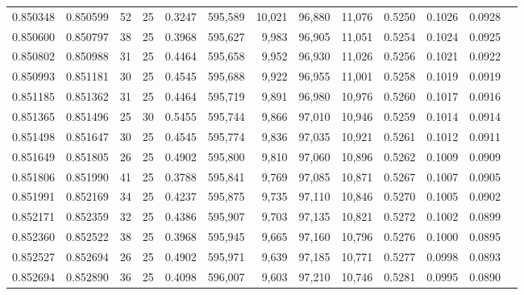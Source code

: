 \begin{tabular}{rrrrrrrrrrrrr}
0.850348 & 0.850599 &    52 &  25 &                                     0.3247 & 595,589 &  10,021 &  96,880 &  11,076 & 0.5250 & 0.1026 & 0.0928 \\
0.850600 & 0.850797 &    38 &  25 &                                     0.3968 & 595,627 &   9,983 &  96,905 &  11,051 & 0.5254 & 0.1024 & 0.0925 \\
0.850802 & 0.850988 &    31 &  25 &                                     0.4464 & 595,658 &   9,952 &  96,930 &  11,026 & 0.5256 & 0.1021 & 0.0922 \\
0.850993 & 0.851181 &    30 &  25 &                                     0.4545 & 595,688 &   9,922 &  96,955 &  11,001 & 0.5258 & 0.1019 & 0.0919 \\
0.851185 & 0.851362 &    31 &  25 &                                     0.4464 & 595,719 &   9,891 &  96,980 &  10,976 & 0.5260 & 0.1017 & 0.0916 \\
0.851365 & 0.851496 &    25 &  30 &                                     0.5455 & 595,744 &   9,866 &  97,010 &  10,946 & 0.5259 & 0.1014 & 0.0914 \\
0.851498 & 0.851647 &    30 &  25 &                                     0.4545 & 595,774 &   9,836 &  97,035 &  10,921 & 0.5261 & 0.1012 & 0.0911 \\
0.851649 & 0.851805 &    26 &  25 &                                     0.4902 & 595,800 &   9,810 &  97,060 &  10,896 & 0.5262 & 0.1009 & 0.0909 \\
0.851806 & 0.851990 &    41 &  25 &                                     0.3788 & 595,841 &   9,769 &  97,085 &  10,871 & 0.5267 & 0.1007 & 0.0905 \\
0.851991 & 0.852169 &    34 &  25 &                                     0.4237 & 595,875 &   9,735 &  97,110 &  10,846 & 0.5270 & 0.1005 & 0.0902 \\
0.852171 & 0.852359 &    32 &  25 &                                     0.4386 & 595,907 &   9,703 &  97,135 &  10,821 & 0.5272 & 0.1002 & 0.0899 \\
0.852360 & 0.852522 &    38 &  25 &                                     0.3968 & 595,945 &   9,665 &  97,160 &  10,796 & 0.5276 & 0.1000 & 0.0895 \\
0.852527 & 0.852694 &    26 &  25 &                                     0.4902 & 595,971 &   9,639 &  97,185 &  10,771 & 0.5277 & 0.0998 & 0.0893 \\
0.852694 & 0.852890 &    36 &  25 &                                     0.4098 & 596,007 &   9,603 &  97,210 &  10,746 & 0.5281 & 0.0995 & 0.0890 \\

\end{tabular}
